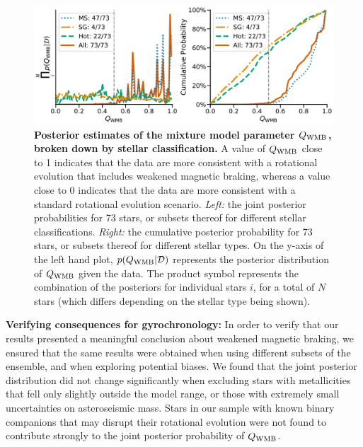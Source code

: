 \documentclass[12pt]{article}
\newcommand{\rtwo}[1]{{#1}}
\begin{document}
\begin{figure}
	\centering
	\includegraphics[width=\textwidth]{modelresults_Fig4.pdf}
	\caption{\textbf{Posterior estimates of the mixture model parameter $Q_{\rm WMB}$, broken down by stellar classification.} A value of $Q_{\rm WMB}$ close to 1 indicates that the data are more consistent with a rotational evolution that includes weakened magnetic braking, whereas a value close to 0 indicates that the data are more consistent with a standard rotational evolution scenario. \textit{Left:} \rtwo{the joint posterior probabilities} for 73 stars, or subsets thereof for different stellar classifications. \textit{Right:} the cumulative posterior probability for 73 stars, or subsets thereof for different stellar types. On the y-axis of the left hand plot, $p(Q_{\rm WMB} | \mathcal{D})$ represents the posterior distribution of $Q_{\rm WMB}$ given the data. The product symbol represents the combination of the posteriors for individual stars $i$, for a total of $N$ stars (which differs depending on the stellar type being shown).}
	\label{fig:gyroresults}
\end{figure}

\textbf{Verifying consequences for gyrochronology:} In order to verify that our results presented a meaningful \rtwo{conclusion about} weakened magnetic braking, we ensured that the same results were obtained when using different subsets of the ensemble, and when exploring potential biases. We found that the joint posterior distribution did not change significantly when excluding stars with metallicities that fell only slightly outside the model range, or those with extremely small uncertainties on asteroseismic mass. Stars in our sample with known binary companions that may disrupt their rotational evolution were not found to contribute strongly to the joint posterior probability of $Q_{\rm WMB}$. 
\end{document}
